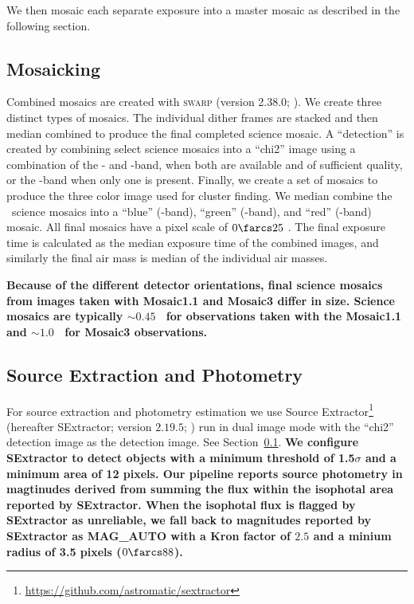 \documentclass[apj, revtex4-1]{emulateapj}
\begin{document}
We then mosaic each separate exposure into a master mosaic as described in the following section.

\subsection{Mosaicking}\label{sec:mosaicks}
Combined mosaics are created with \textsc{swarp} (version 2.38.0; \citealt{Bertin2002}). We create three distinct types of mosaics. The individual dither frames are stacked and then median combined to produce the final completed science mosaic. A ``detection'' is created by combining select science mosaics into a ``chi2'' image using a combination of the \sdssi- and \sdssz-band, when both are available and of sufficient quality, or the \sdssi-band when only one is present. Finally, we create a set of mosaics to produce the three color image used for cluster finding. We median combine the \sdssg\sdssr\sdssi\sdssz\ science mosaics into a ``blue'' (\sdssg-band), ``green'' (\sdssr-band), and ``red'' (\sdssi\sdssz-band) mosaic. All final mosaics have a pixel scale of $0\farcs25$ \perpixel. The final exposure time is calculated as the median exposure time of the combined images, and similarly the final air mass is median of the individual air masses.

\textbf{Because of the different detector orientations, final science mosaics from images taken with Mosaic1.1 and Mosaic3 differ in size. Science mosaics are typically $\sim0.45$ \degsq\ for observations taken with the Mosaic1.1 and $\sim1.0$ \degsq\ for Mosaic3 observations.}


\subsection{Source Extraction and Photometry}\label{sec:sextractor}
For source extraction and photometry estimation we use Source Extractor\footnote{\url{https://github.com/astromatic/sextractor}} (hereafter SExtractor; version $2.19.5$; \citealt{Bertin1996}) run in dual image mode with the ``chi2'' detection image as the detection image. See Section~\ref{sec:mosaicks}. \textbf{ We configure SExtractor to detect objects with a minimum threshold of 1.5$\sigma$ and a minimum area of 12 pixels.
Our pipeline reports source photometry in magtinudes derived from summing the flux within the isophotal area reported by SExtractor. When the isophotal flux is flagged by SExtractor as unreliable, we fall back to magnitudes reported by SExtractor as \textsc{MAG\_AUTO} with a Kron factor \citep{Kron1980} of $2.5$ and a minium radius of 3.5 pixels ($0\farcs88$).}
\end{document}
